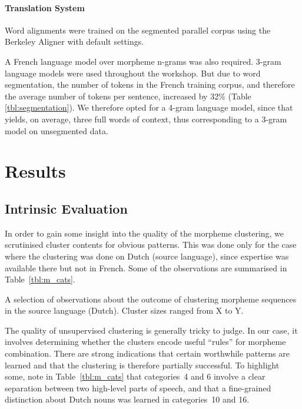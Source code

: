 \paragraph{Translation System}
Word alignments were trained on the segmented parallel corpus using the Berkeley Aligner \citep{Liang2006} with default settings.

A French language model over morpheme n-grams was also required.
3-gram language models were used throughout the workshop.
But due to word segmentation, the number of tokens in the French training corpus, and therefore the average number of tokens per sentence, increased by 32\% (Table \ref{tbl:segmentation}).
We therefore opted for a 4-gram language model, since that yields, on average, three full words of context, thus corresponding to a 3-gram model on unsegmented data.

\section{Results}

\subsection{Intrinsic Evaluation}
In order to gain some insight into the quality of the morpheme clustering, we scrutinised cluster contents for obvious patterns.
This was done only for the case where the clustering was done on Dutch (source language), since expertise was available there but not in French.
Some of the observations are summarised in Table~\ref{tbl:m_cats}. 

\begin{table}[hbt]
  \centering
  
  \caption{A selection of observations about the outcome of clustering morpheme sequences in the source language (Dutch). Cluster sizes ranged from X to Y.}
  \label{tbl:m_cats}
\end{table}

The quality of unsupervised clustering is generally tricky to judge.
In our case, it involves determining whether the clusters encode useful ``rules'' for morpheme combination.
There are strong indications that certain worthwhile patterns are learned and that the clustering is therefore partially successful.
To highlight some, note in Table~\ref{tbl:m_cats} that categories~4 and 6 involve a clear separation between two high-level parts of speech, and that a fine-grained distinction about Dutch nouns was learned in categories~10 and 16.


